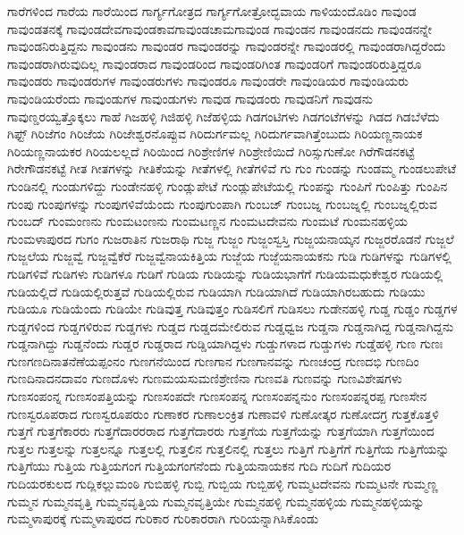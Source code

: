 {ಗಾರೆಗಳಿಂದ
ಗಾರೆಯ
ಗಾರೆಯಿಂದ
ಗಾರ್ಗ್ಯಗೋತ್ರದ
ಗಾರ್ಗ್ಯಗೋತ್ರೋದ್ಭವಾಯ
ಗಾಳಿಯಂದೊಡಿಂ
ಗಾವುಂಡ
ಗಾವುಂಡತನಕ್ಕೆ
ಗಾವುಂಡದೇವಗಾವುಂಡಕಾವಗಾವುಂಡಚಾಮಗಾವುಂಡ
ಗಾವುಂಡನ
ಗಾವುಂಡನದು
ಗಾವುಂಡನನ್ನೇ
ಗಾವುಂಡನಿರುತ್ತಿದ್ದನು
ಗಾವುಂಡನು
ಗಾವುಂಡರ
ಗಾವುಂಡರನ್ನು
ಗಾವುಂಡರನ್ನೇ
ಗಾವುಂಡರಲ್ಲಿ
ಗಾವುಂಡರಾಗಿದ್ದರೆಂದು
ಗಾವುಂಡರಾಗಿರುವುದಿಲ್ಲ
ಗಾವುಂಡರಾದ
ಗಾವುಂಡರಿಂದ
ಗಾವುಂಡರಿಗಿಂತ
ಗಾವುಂಡರಿಗೆ
ಗಾವುಂಡರಿರುತ್ತಿದ್ದರೂ
ಗಾವುಂಡರು
ಗಾವುಂಡರುಗಳ
ಗಾವುಂಡರುಗಳು
ಗಾವುಂಡರೂ
ಗಾವುಂಡರೇ
ಗಾವುಂಡಿಯರ
ಗಾವುಂಡಿಯರು
ಗಾವುಂಡಿಯರೆಂದು
ಗಾವುಂಡುಗಳ
ಗಾವುಂಡುಗಳು
ಗಾವುಡ
ಗಾವುಡಂರು
ಗಾವುಡನಿಗೆ
ಗಾವುಡನು
ಗಾವುಣ್ಡರಯ್ವತ್ತೊಕ್ಕಲು
ಗಾಹೆ
ಗಿಜಹಳ್ಳಿ
ಗಿಜಿಹಳ್ಳಿ
ಗಿಜೆಹಳ್ಳಿಯ
ಗಿಡಗಂಟಿಗಳು
ಗಿಡಗಂಟೆಗಳನ್ನು
ಗಿಡದ
ಗಿಡಬೆಳೆದು
ಗಿಫ್ಟ್
ಗಿರಿಜೆಗಂ
ಗಿರಿಜೆಯ
ಗಿರಿಜೇಶ್ವರನೊಪ್ಪುವ
ಗಿರಿದುರ್ಗಮಲ್ಲ
ಗಿರಿದುರ್ಗವಾಗಿತ್ತೆಂಬುದು
ಗಿರಿಯಣ್ಣನಾಯಕ
ಗಿರಿಯಣ್ಣನಾಯಕರ
ಗಿರಿಯಲಲ್ಲದೆ
ಗಿರಿಯಿಂದ
ಗಿರಿಶ್ರೇಣಿಗಳ
ಗಿರಿಶ್ರೇಣಿಯಿದೆ
ಗಿರಿಸ್ಸುಗುಣೋ
ಗಿರೆಗೌಡನಕಟ್ಟೆ
ಗಿರೇಗೌಡನಕಟ್ಟೆ
ಗೀತ
ಗೀತಗಳನ್ನು
ಗೀತಿಕೆಯನ್ನು
ಗೀತೆಗಳಲ್ಲಿ
ಗೀತೆಗಳಿವೆ
ಗು
ಗುಂ
ಗುಂಡನ್ನು
ಗುಂಡಮ್ಮ
ಗುಂಡಲುಪೇಟೆ
ಗುಂಡಿನಲ್ಲಿ
ಗುಂಡುಗಳಿದ್ದು
ಗುಂಡೇನಹಳ್ಳಿ
ಗುಂಡ್ಲುಪೇಟೆ
ಗುಂಡ್ಲುಪೇಟೆಯಲ್ಲಿ
ಗುಂಪನ್ನು
ಗುಂಪಿಗೆ
ಗುಂಪಿತ್ತು
ಗುಂಪಿನ
ಗುಂಪು
ಗುಂಪುಗಳನ್ನು
ಗುಂಪುಗಳಿವೆಯೆಂದು
ಗುಂಪುಗುಂಪಾಗಿ
ಗುಂಬಜ್
ಗುಂಬಜ್ನ
ಗುಂಬಜ್ನಲ್ಲಿ
ಗುಂಬಜ್ನಲ್ಲಿರುವ
ಗುಂಬದ್
ಗುಂಮಂಣನು
ಗುಂಮಟಂಣನು
ಗುಂಮಟಣ್ಣನ
ಗುಂಮಟದೇವನು
ಗುಂಮಟೆ
ಗುಂಮನಹಳ್ಳಿಯ
ಗುಂಮಳಾಪುರದ
ಗುಗಂ
ಗುಜರಾತಿನ
ಗುಜರಾಥಿ
ಗುಜ್ಜ
ಗುಜ್ಜಂ
ಗುಜ್ಜಂಸ್ವಸ್ತಿ
ಗುಜ್ಜಯನಾಯ್ಕನ
ಗುಜ್ಜರರೊಡನೆ
ಗುಜ್ಜಲೆ
ಗುಜ್ಜಲೆಯ
ಗುಜ್ಜವ್ವೆ
ಗುಜ್ಜವ್ವೆಕೆರೆ
ಗುಜ್ಜವ್ವೆನಾಯಕಿತ್ತಿಯ
ಗುಜ್ಜೆಯ
ಗುಜ್ಜೆಯನಾಯಕನು
ಗುಡಿ
ಗುಡಿಗಳನ್ನು
ಗುಡಿಗಳಲ್ಲಿ
ಗುಡಿಗಳಿವೆ
ಗುಡಿಗಳು
ಗುಡಿಗಳೂ
ಗುಡಿಗೆ
ಗುಡಿಯ
ಗುಡಿಯನ್ನು
ಗುಡಿಯಭಾಗೆಗೆ
ಗುಡಿಯಮಧುಕೇಶ್ವರ
ಗುಡಿಯಲ್ಲಿ
ಗುಡಿಯಲ್ಲಿದೆ
ಗುಡಿಯಲ್ಲಿರುತ್ತವೆ
ಗುಡಿಯಲ್ಲಿರುವ
ಗುಡಿಯಾಗಿ
ಗುಡಿಯಾಗಿದೆ
ಗುಡಿಯಾಗಿರಬಹುದು
ಗುಡಿಯು
ಗುಡಿಯೂ
ಗುಡಿಯೆಂದು
ಗುಡಿಯೇ
ಗುಡಿವುತ್ತ
ಗುಡಿವುತ್ತಂ
ಗುಡಿಸಲಿಗೆ
ಗುಡಿಸಲು
ಗುಡೇನಹಳ್ಳಿ
ಗುಡ್ಡ
ಗುಡ್ಡಂ
ಗುಡ್ಡಗಳ
ಗುಡ್ಡಗಳಿಂದ
ಗುಡ್ಡಗಳಿರುವ
ಗುಡ್ಡಗಳು
ಗುಡ್ಡದ
ಗುಡ್ಡದಮೇಲಿರುವ
ಗುಡ್ಡಧ್ವಜ
ಗುಡ್ಡನಾ
ಗುಡ್ಡನಾಗಿದ್ದ
ಗುಡ್ಡನಾಗಿದ್ದನು
ಗುಡ್ಡನಾಗಿದ್ದು
ಗುಡ್ಡನೆಂದು
ಗುಡ್ಡರ
ಗುಡ್ಡರಾದ
ಗುಡ್ಡಿಯಾಗಿದ್ದಳು
ಗುಡ್ಡುಗಳಾದ
ಗುಡ್ಡುಗಳು
ಗುಡ್ಡೆಹಳ್ಳಿ
ಗುಣ
ಗುಣಃ
ಗುಣಗಣದಿನಾತನೆಣೆಯಪ್ಪಂನಂ
ಗುಣಗನೆಯಿಂದ
ಗುಣಗಾನ
ಗುಣಗಾನವನ್ನು
ಗುಣಚಂದ್ರ
ಗುಣದಭಿ
ಗುಣದಿಂ
ಗುಣದಿನಾದನದಾವಂ
ಗುಣದೊಳು
ಗುಣಮಯಸುಮಣಿಶ್ರೇಣಿನಾ
ಗುಣವತಿ
ಗುಣವನ್ನು
ಗುಣವಿಶೇಷಗಳು
ಗುಣಸಂಪಂನ್ನ
ಗುಣಸಂಪತ್ತಿಯನ್ನು
ಗುಣಸಂಪದೇ
ಗುಣಸಂಪನ್ನ
ಗುಣಸಂಪನ್ನನುಂ
ಗುಣಸಂಪನ್ನರಪ್ಪ
ಗುಣಸೇನ
ಗುಣಸ್ವರೂಪರಾದ
ಗುಣಸ್ವರೂಪರುಂ
ಗುಣಾಕರ
ಗುಣಾಲಂಕ್ರಿತ
ಗುಣಾವಳಿ
ಗುಣೋತ್ಕರ
ಗುಣೋದಗ್ರ
ಗುತ್ತಕೊತ್ತಳಿ
ಗುತ್ತಗೆ
ಗುತ್ತಗೆಕಾರರು
ಗುತ್ತಗೆದಾರರರಾದ
ಗುತ್ತಗೆದಾರರು
ಗುತ್ತಗೆಯ
ಗುತ್ತಗೆಯನ್ನು
ಗುತ್ತಗೆಯಾಗಿ
ಗುತ್ತಗೆಯಿಂದ
ಗುತ್ತಲ
ಗುತ್ತಲನ್ನು
ಗುತ್ತಲನ್ನೂ
ಗುತ್ತಲಲ್ಲಿ
ಗುತ್ತಲಿನ
ಗುತ್ತಲಿನಲ್ಲಿ
ಗುತ್ತಲು
ಗುತ್ತಿಗೆ
ಗುತ್ತಿಗೆಗೆ
ಗುತ್ತಿಗೆಯ
ಗುತ್ತಿಗೆಯನ್ನು
ಗುತ್ತಿಗೆಯು
ಗುತ್ತಿಯ
ಗುತ್ತಿಯಗಂಗ
ಗುತ್ತಿಯಗಂಗನೆಂದು
ಗುತ್ತಿಯನಾಯಕನ
ಗುದಿ
ಗುದಿಗೆ
ಗುದಿಯರ
ಗುದಿಯರಕುಲದ
ಗುದ್ಲಿಕಲ್ಲುಮಂಠಿ
ಗುಬಿಹಳ್ಳಿ
ಗುಬ್ಬಿ
ಗುಬ್ಬಿಯ
ಗುಬ್ಬಿಹಳ್ಳಿ
ಗುಮ್ಮಟದೇವನು
ಗುಮ್ಮಟನೇ
ಗುಮ್ಮಣ್ಣ
ಗುಮ್ಮನ
ಗುಮ್ಮನವೃತ್ತಿ
ಗುಮ್ಮನವೃತ್ತಿಯ
ಗುಮ್ಮನವೃತ್ತಿಯೇ
ಗುಮ್ಮನಹಳ್ಳಿ
ಗುಮ್ಮನಹಳ್ಳಿಯ
ಗುಮ್ಮನಹಳ್ಳಿಯನ್ನು
ಗುಮ್ಮಳಾಪುರಕ್ಕೆ
ಗುಮ್ಮಳಾಪುರದ
ಗುರಿಕಾರ
ಗುರಿಕಾರರಾಗಿ
ಗುರಿಯನ್ನಾಗಿಸಿಕೊಂಡು
}
